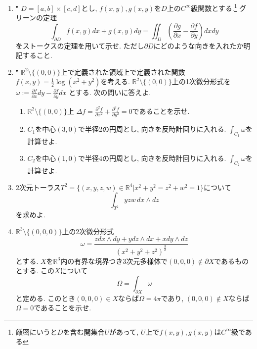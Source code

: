 \documentclass[dvipdfmx,a4paper,11pt]{article}
\newcommand{\R}{\mathbb{R}}
\theoremstyle{definition}
\newcommand{\pdrv}[2]{\frac{\partial #1}{\partial #2}}
\begin{document}
\begin{enumerate}[label=\textbf{問}\ref*{sec-stokes}.\arabic*]
\item  $^{\bullet}$ $D=[a,b] \times [c, d]$とし, $f(x,y), g(x,y)$を$D$上の$C^{\infty}$級関数とする.\footnote{厳密にいうと$D$を含む開集合$U$があって, $U$上で$f(x,y), g(x,y)$は$C^{\infty}$級である}
グリーンの定理
$$
\int_{\partial D} f(x,y) dx + g(x,y) dy = \iint_{D} \left(\pdrv{g}{x}  -\pdrv{f}{y} \right) dxdy
$$
をストークスの定理を用いて示せ. ただし$\partial D$にどのような向きを入れたか明記すること.

\item $^{\bullet}$ $\R^{2} \setminus \{ (0,0)\}$上で定義された領域上で定義された関数$f(x,y) = \frac{1}{2}\log(x^2 +y^2)$を考える. $\R^{2}  \setminus  \{ (0,0)\}$上の1次微分形式を
$
\omega := \pdrv{f}{x}dy -  \pdrv{f}{y}dx
$
とする. 次の問いに答えよ.
\begin{enumerate}
 \setlength{\parskip}{0cm}
  \setlength{\itemsep}{2pt} 
\item $\R^{2} \setminus \{ (0,0)\}$上 $\Delta f = \pdrv{^2f}{x^2} + \pdrv{^2f}{y^2} =0$であることを示せ.
\item $C_1$を中心$(3,0)$で半径2の円周とし, 向きを反時計回りに入れる. $\int_{C_1} \omega$を計算せよ.
\item $C_2$を中心$(1,0)$で半径4の円周とし, 向きを反時計回りに入れる. $\int_{C_2} \omega$を計算せよ.
\end{enumerate}

\item 2次元トーラス$T^2 = \{(x,y,z,w) \in \R^4 | x^2 + y^2 = z^2 + w^2 =1\}$について
$$
\int_{T^2} yzw \, dx \wedge dz
$$
を求めよ. 

\item $\R^3 \setminus \{ (0,0,0)\}$上の2次微分形式
$$
\omega = \frac{z dx \wedge dy  + y dz \wedge dx + x dy \wedge dz}{(x^2 + y^2+ z^2)^{\frac{3}{2}}}
$$
とする. $X$を$\R^3$内の有界な境界つき3次元多様体で$(0,0,0) \not \in \partial X $であるものとする. 
この$X$について
$$
\Omega = \int_{\partial X} \omega
$$
と定める. このとき$(0,0,0) \in X$ならば$\Omega=4 \pi$であり, $(0,0,0) \not \in X$ならば$\Omega=0$であることを示せ.  


\end{enumerate}
\end{document}
